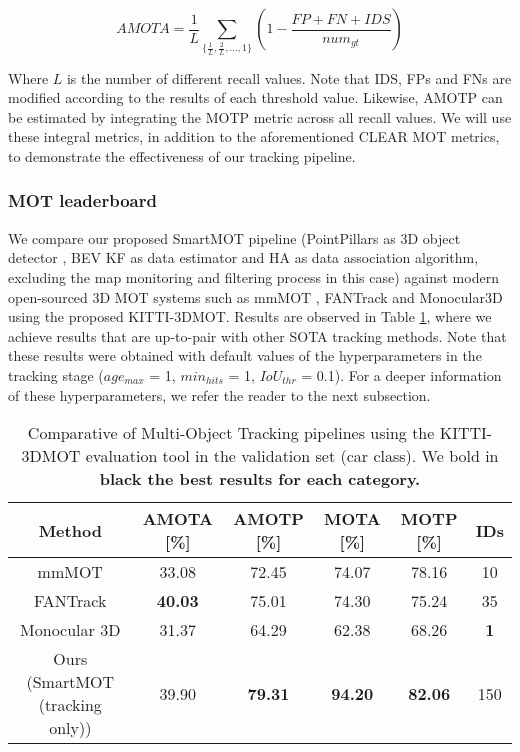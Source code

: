 \begin{equation}
	\label{eq:4_amota}
	AMOTA = \frac{1}{L}\sum_{\{\frac{1}{L},\frac{2}{L},...,1\}}(1-\frac{FP+FN+IDS}{num_{gt}})
\end{equation}

Where $L$ is the number of different recall values. Note that \ac{IDS}, \acp{FP} and \acp{FN} are modified according to the results of each threshold value. Likewise, \ac{AMOTP} can be estimated by integrating the \ac{MOTP} metric across all recall values. We will use these integral metrics, in addition to the aforementioned CLEAR \ac{MOT} metrics, to demonstrate the effectiveness of our tracking pipeline. 

\subsubsection{MOT leaderboard}
\label{subsubsec:4_mot_leaderboard}

We compare our proposed SmartMOT pipeline (PointPillars as 3D object detector \cite{lang2019pointpillars}, \ac{BEV} \ac{KF} as data estimator and \ac{HA} as data association algorithm, excluding the map monitoring and filtering process in this case) against modern open-sourced 3D MOT systems such as mmMOT \cite{zhang2019robust}, FANTrack \cite{baser2019fantrack} and Monocular3D \cite{weng2019monocular} using the proposed KITTI-3DMOT. Results are observed in Table \ref{table:4_MOT_pipelines_validation}, where we achieve results that are up-to-pair with other \ac{SOTA} tracking methods. Note that these results were obtained with default values of the hyperparameters in the tracking stage ($age_{max}$ = 1, $min_{hits}$ = 1, $IoU_{thr}$ = 0.1). For a deeper information of these hyperparameters, we refer the reader to the next subsection.

\begin{table}[h]
	\captionsetup{justification=justified}
	\caption[Comparative of Multi-Object Tracking pipelines using the KITTI-3DMOT evaluation tool in the validation set (car class)]{Comparative of Multi-Object Tracking pipelines using the KITTI-3DMOT evaluation tool in the validation set (car class). We bold in \bf{black} the best results for each category.}
	\label{table:4_MOT_pipelines_validation}
	\begin{center}
		\begin{tabular}{c | ccccc}
			\toprule
			Method & AMOTA [\%] &  AMOTP [\%] &  MOTA [\%] &  MOTP [\%] & IDs \\
			\midrule
			mmMOT \cite{zhang2019robust} & 33.08 & 72.45 & 74.07 & 78.16 & 10  \\
			FANTrack \cite{baser2019fantrack} & \bf{40.03} & 75.01 & 74.30 & 75.24 & 35 \\
			Monocular 3D \cite{weng2019monocular} & 31.37 & 64.29 & 62.38 & 68.26 & \bf{1} \\
			\midrule
			Ours (SmartMOT \cite{gomez2021smartmot} (tracking only)) & 39.90 & \bf{79.31} & \bf{94.20} & \bf{82.06} & 150 \\ 
			\bottomrule
		\end{tabular}
	\end{center}
\end{table}

